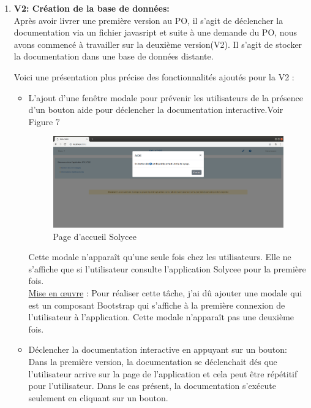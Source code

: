 \documentclass[12pt]{article}
\begin{document}
\begin{enumerate}
\item \textbf{V2: Création de la base de données: }\\

Après avoir livrer une première version au PO, il s'agit de déclencher la documentation via un fichier javasript et suite à une demande du PO, nous avons commencé à travailler sur la deuxième version(V2). Il s'agit de stocker la documentation dans une base de données distante. 

Voici une présentation plus précise des fonctionnalités ajoutés pour la V2 :

\begin{itemize}
\item  L'ajout d'une fenêtre modale pour prévenir les utilisateurs de la présence d'un bouton aide pour déclencher la documentation interactive.Voir Figure 7

\begin{figure}[H]
	\centering
 		\includegraphics[width=1\textwidth]{diagrammes/aide_modal.png}
  		\caption{Page d'accueil Solycee}
	\end{figure}
Cette modale n'apparaît qu'une seule fois chez les utilisateurs. Elle ne s'affiche que si l'utilisateur consulte l'application Solycee pour la première fois. \\ 


\underline{Mise en œuvre} :
Pour réaliser cette tâche, j'ai dû ajouter une modale qui est un composant Bootstrap qui s'affiche à la première connexion de l'utilisateur à l'application. Cette modale n'apparaît pas une deuxième fois. \\ 

   
\item  Déclencher la documentation interactive en appuyant sur un bouton: Dans la première version, la documentation se déclenchait dés que l'utilisateur arrive sur la page de l'application et cela peut être répétitif pour l'utilisateur. Dans le cas présent, la documentation s'exécute seulement en cliquant sur un bouton. \\ 


\end{itemize}
\end{enumerate}
\end{document}
